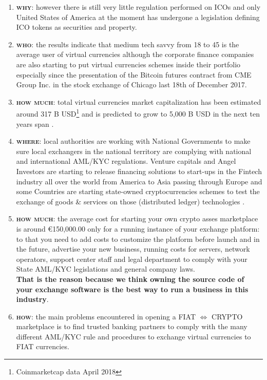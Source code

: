 \documentclass[11pt,fleqn]{book} %
\begin{document}
\begin{enumerate}
	\item \textbf{\textsc{why}}: however there is still very little regulation performed on ICOs and only United States of America at the moment has undergone
	a legislation defining ICO tokens as securities and property. \cite{SECICO}
	\item \textbf{\textsc{who}}: the results indicate that medium tech savvy from 18 to 45 is the average user of
	virtual currencies although the corporate finance companies are also starting to put 
	virtual currencies schemes inside their portfolio especially since the presentation 
	of the Bitcoin futures contract from CME Group Inc. in the stock exchange of Chicago
	last 18th of December 2017.
	\item \textbf{\textsc{how much}}: total virtual currencies market capitalization has been estimated around 317 B USD\footnote{Coinmarketcap data April 2018}
	and is predicted to grow to 5,000 B USD in the next ten years span \cite{cryptoMCTenYears}.
	\item \textbf{\textsc{where}}: local authorities are working with National Governments to make sure local exchangers
	in the national territory are complying with national and international AML/KYC regulations.
	Venture capitals and Angel Investors are starting to release financing solutions to start-ups 
	in the Fintech industry all over the world from America to Asia passing through Europe and some 
	Countries are starting state-owned cryptocurrencies schemes to test the exchange of goods \& services
	on those (distributed ledger) technologies \cite{petro}.
	\item \textbf{\textsc{how much}}: the average cost for starting your own crypto asses marketplace is around \euro 150,000.00 only 
	for a running instance of your exchange platform:
	to that you need to add costs to customize the platform before launch and in the future, advertise your new business, running costs for servers,
	network operators, support center staff and legal department to comply with your State AML/KYC legislations and general company laws.\\
	\textbf{That is the reason because we think owning the source code of your exchange software is the best way to run a business in this industry}.
	\item \textbf{\textsc{how}}: the main problems encountered in opening a FIAT $\Leftrightarrow$ CRYPTO marketplace is to find trusted
	banking partners to comply with the many different AML/KYC rule and procedures to exchange virtual currencies
	to FIAT currencies.

\end{enumerate}
\end{document}
